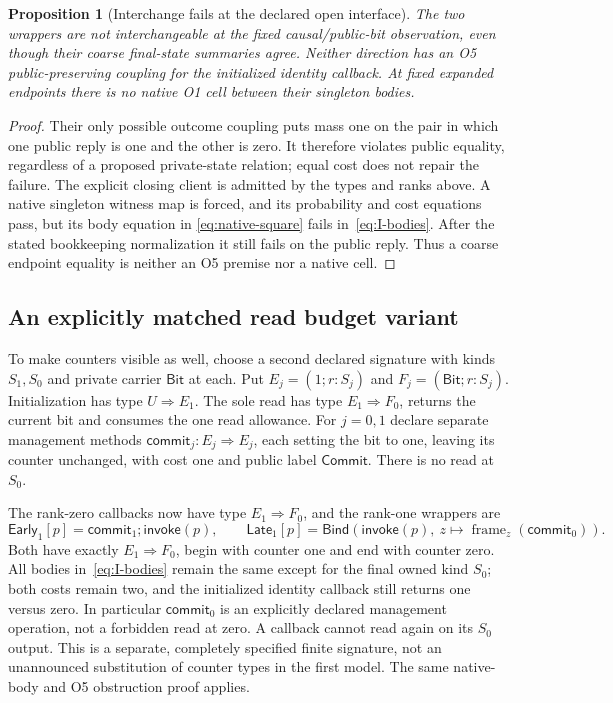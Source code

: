 \documentclass[11pt,a4paper]{article}
\newtheorem{proposition}[theorem]{Proposition}
\theoremstyle{definition}
\newcommand{\Bind}{\mathsf{Bind}}
\newcommand{\Invoke}{\mathsf{invoke}}
\begin{document}
\begin{proposition}[Interchange fails at the declared open interface]
The two wrappers are not interchangeable at the fixed causal/public-bit
observation, even though their coarse final-state summaries agree.
Neither direction has an O5 public-preserving coupling for the initialized
identity callback. At fixed expanded endpoints there is no native O1
cell between their singleton bodies.
\end{proposition}
\begin{proof}
Their only possible outcome coupling puts mass one on the pair in which
one public reply is one and the other is zero. It therefore violates
public equality, regardless of a proposed private-state relation; equal
cost does not repair the failure. The explicit closing client is admitted
by the types and ranks above. A native singleton witness map is forced,
and its probability and cost equations pass, but its body equation in
\eqref{eq:native-square} fails in~\eqref{eq:I-bodies}. After the stated
bookkeeping normalization it still fails on the public reply. Thus a
coarse endpoint equality is neither an O5 premise nor a native cell.
\end{proof}

\subsection{An explicitly matched read budget variant}
To make counters visible as well, choose a second declared signature with
kinds $S_1,S_0$ and private carrier $\mathsf{Bit}$ at each. Put
$E_j=(1;r:S_j)$ and $F_j=(\mathsf{Bit};r:S_j)$. Initialization has type
$U\Rightarrow E_1$. The sole read has type $E_1\Rightarrow F_0$, returns
the current bit and consumes the one read allowance. For $j=0,1$ declare
separate management methods
$\mathsf{commit}_j:E_j\Rightarrow E_j$, each setting the bit to one,
leaving its counter unchanged, with cost one and public label
$\mathsf{Commit}$. There is no read at $S_0$.

The rank-zero callbacks now have type $E_1\Rightarrow F_0$, and the
rank-one wrappers are
\[
\mathsf{Early}_1[p]=\mathsf{commit}_1;\Invoke(p),\qquad
\mathsf{Late}_1[p]=\Bind(\Invoke(p),\ z\mapsto
                                    \operatorname{frame}_z(\mathsf{commit}_0)).
\]
Both have exactly $E_1\Rightarrow F_0$, begin with counter one and end
with counter zero. All bodies in~\eqref{eq:I-bodies} remain the same
except for the final owned kind $S_0$; both costs remain two, and the
initialized identity callback still returns one versus zero. In
particular $\mathsf{commit}_0$ is an explicitly declared management
operation, not a forbidden read at zero. A callback cannot read again
on its $S_0$ output. This is a separate, completely specified finite
signature, not an unannounced substitution of counter types in the first
model. The same native-body and O5 obstruction proof applies.
\end{document}
